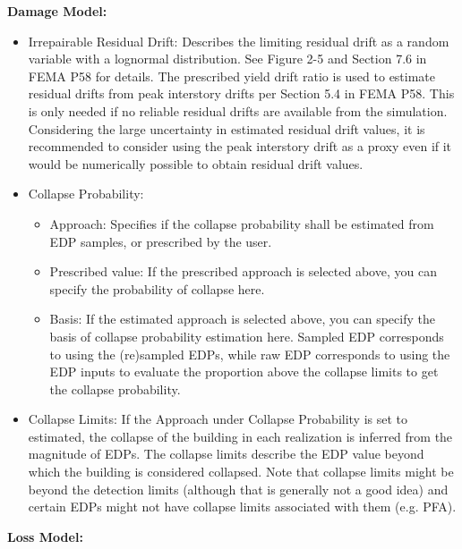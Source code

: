 \textbf{Damage Model:}

\begin{itemize}
	\item Irrepairable Residual Drift: Describes the limiting residual drift as a random variable with a lognormal distribution. See Figure 2-5 and Section 7.6 in FEMA P58 for details. The prescribed yield drift ratio is used to estimate residual drifts from peak interstory drifts per Section 5.4 in FEMA P58. This is only needed if no reliable residual drifts are available from the simulation. Considering the large uncertainty in estimated residual drift values, it is recommended to consider using the peak interstory drift as a proxy even if it would be numerically possible to obtain residual drift values.
	\item Collapse Probability: 
	\begin{itemize}
		\item Approach: Specifies if the collapse probability shall be estimated from EDP samples, or prescribed by the user.
		\item Prescribed value: If the prescribed approach is selected above, you can specify the probability of collapse here.
		\item Basis: If the estimated approach is selected above, you can specify the basis of collapse probability estimation here. Sampled EDP corresponds to using the (re)sampled EDPs, while raw EDP corresponds to using the EDP inputs to evaluate the proportion above the collapse limits to get the collapse probability.
	\end{itemize}
	\item Collapse Limits: If the Approach under Collapse Probability is set to estimated, the collapse of the building in each realization is inferred from the magnitude of EDPs. The collapse limits describe the EDP value beyond which the building is considered collapsed. Note that collapse limits might be beyond the detection limits (although that is generally not a good idea) and certain EDPs might not have collapse limits associated with them (e.g. PFA).
\end{itemize}

\textbf{Loss Model:}

